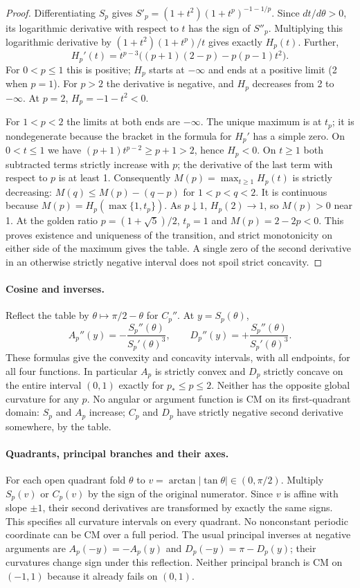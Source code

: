 \documentclass[11pt,a4paper]{article}
\numberwithin{equation}{section}
\theoremstyle{definition}
\theoremstyle{remark}
\begin{document}
\begin{proof}
Differentiating $S_p$ gives $S'_p=(1+t^2)(1+t^p)^{-1-1/p}$. Since $dt/d\theta>0$, its logarithmic derivative with respect to $t$ has the sign of $S''_p$. Multiplying this logarithmic derivative by $(1+t^2)(1+t^p)/t$ gives exactly $H_p(t)$. Further,
\[
 H_p'(t)=t^{p-3}\big((p+1)(2-p)-p(p-1)t^2\big).
\]
For $0<p\le1$ this is positive; $H_p$ starts at $-\infty$ and ends at a positive limit (2 when $p=1$). For $p>2$ the derivative is negative, and $H_p$ decreases from 2 to $-\infty$. At $p=2$, $H_p=-1-t^2<0$.

For $1<p<2$ the limits at both ends are $-\infty$. The unique maximum is at $t_p$; it is nondegenerate because the bracket in the formula for $H_p'$ has a simple zero. On $0<t\le1$ we have $(p+1)t^{p-2}\ge p+1>2$, hence $H_p<0$. On $t\ge1$ both subtracted terms strictly increase with $p$; the derivative of the last term with respect to $p$ is at least 1. Consequently $M(p)=\max_{t\ge1}H_p(t)$ is strictly decreasing: $M(q)\le M(p)-(q-p)$ for $1<p<q<2$. It is continuous because $M(p)=H_p(\max\{1,t_p\})$. As $p\downarrow1$, $H_p(2)\to1$, so $M(p)>0$ near 1. At the golden ratio $p=(1+\sqrt5)/2$, $t_p=1$ and $M(p)=2-2p<0$. This proves existence and uniqueness of the transition, and strict monotonicity on either side of the maximum gives the table. A single zero of the second derivative in an otherwise strictly negative interval does not spoil strict concavity.
\end{proof}

\paragraph{Cosine and inverses.} Reflect the table by $\theta\mapsto\pi/2-\theta$ for $C_p''$. At $y=S_p(\theta)$,
\[
 A_p''(y)=-\frac{S_p''(\theta)}{S_p'(\theta)^3},\qquad
 D_p''(y)=+\frac{S_p''(\theta)}{S_p'(\theta)^3}.
\]
These formulas give the convexity and concavity intervals, with all endpoints, for all four functions. In particular $A_p$ is strictly convex and $D_p$ strictly concave on the entire interval $(0,1)$ exactly for $p_*\le p\le2$. Neither has the opposite global curvature for any $p$. No angular or argument function is CM on its first-quadrant domain: $S_p$ and $A_p$ increase; $C_p$ and $D_p$ have strictly negative second derivative somewhere, by the table.

\paragraph{Quadrants, principal branches and their axes.}
For each open quadrant fold $\theta$ to $v=\arctan|\tan\theta|\in(0,\pi/2)$. Multiply $S_p(v)$ or $C_p(v)$ by the sign of the original numerator. Since $v$ is affine with slope $\pm1$, their second derivatives are transformed by exactly the same signs. This specifies all curvature intervals on every quadrant. No nonconstant periodic coordinate can be CM over a full period. The usual principal inverses at negative arguments are $A_p(-y)=-A_p(y)$ and $D_p(-y)=\pi-D_p(y)$; their curvatures change sign under this reflection. Neither principal branch is CM on $(-1,1)$ because it already fails on $(0,1)$.
\end{document}
